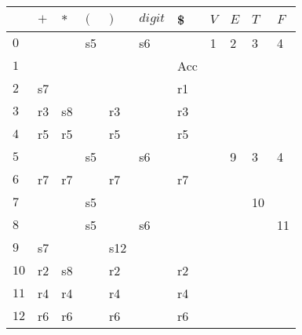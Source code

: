 \documentclass{standalone}
\providecommand\lightrule{%
	\arrayrulecolor{black!30}%
	\midrule[\lightrulewidth]%
	\arrayrulecolor{black}}
\begin{document}
	\begin{tabularx}{\textwidth}{XXXXXXXXXXX}
         & \(+\) & \(*\) & \((\) & \()\) & \(digit\) & \$ & \(V\) & \(E\) & \(T\) & \(F\) \\
        \midrule
            \(0\) & & & s5 & & s6 & & 1 & 2 & 3 & 4
            \\ \lightrule
            \(1\) & & & & & & Acc & & & &
            \\ \lightrule
            \(2\) & s7 & & & & & r1 & & & &
            \\ \lightrule
            \(3\) & r3 & s8 & & r3 & & r3 & & & &
            \\ \lightrule
            \(4\) & r5 & r5 & & r5 & & r5 & & & &
            \\ \lightrule
            \(5\) & & & s5 & & s6 & & & 9 & 3 & 4
            \\ \lightrule
            \(6\) & r7 & r7 & & r7 & & r7 & & & &
            \\ \lightrule
            \(7\) & & & s5 & & & & & & 10 &
            \\ \lightrule
            \(8\) & & & s5 & & s6 & & & & & 11
            \\ \lightrule
            \(9\) & s7 & & & s12 & & & & & &
            \\ \lightrule
            \(10\) & r2 & s8 & & r2 & & r2 & & & &
            \\ \lightrule
            \(11\) & r4 & r4 & & r4 & & r4 & & & &
            \\ \lightrule
            \(12\) & r6 & r6 & & r6 & & r6 & & & &
    \end{tabularx}
\end{document}
